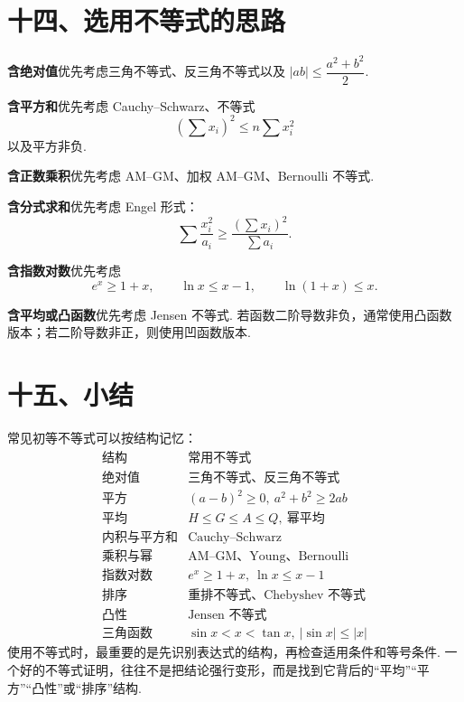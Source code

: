 \documentclass[UTF8, 12pt, fontset=fandol, oneside]{ctexart}
\begin{document}
\section*{十四、选用不等式的思路}

\noindent\textbf{含绝对值}\quad 优先考虑三角不等式、反三角不等式以及 $|ab|\le\dfrac{a^2+b^2}{2}$.

\noindent\textbf{含平方和}\quad 优先考虑 Cauchy--Schwarz、不等式
\[
  \left(\sum x_i\right)^2\le n\sum x_i^2
\]
以及平方非负.

\noindent\textbf{含正数乘积}\quad 优先考虑 AM--GM、加权 AM--GM、Bernoulli 不等式.

\noindent\textbf{含分式求和}\quad 优先考虑 Engel 形式：
\[
  \sum \frac{x_i^2}{a_i}\ge\frac{(\sum x_i)^2}{\sum a_i}.
\]

\noindent\textbf{含指数对数}\quad 优先考虑
\[
  e^x\ge1+x,\qquad \ln x\le x-1,\qquad \ln(1+x)\le x.
\]

\noindent\textbf{含平均或凸函数}\quad 优先考虑 Jensen 不等式. 若函数二阶导数非负，通常使用凸函数版本；若二阶导数非正，则使用凹函数版本.

\section*{十五、小结}

常见初等不等式可以按结构记忆：
\[
\begin{array}{c|c}
  \text{结构} & \text{常用不等式}\\ \hline
  \text{绝对值} & \text{三角不等式、反三角不等式}\\
  \text{平方} & (a-b)^2\ge0,\ a^2+b^2\ge2ab\\
  \text{平均} & H\le G\le A\le Q,\ \text{幂平均}\\
  \text{内积与平方和} & \text{Cauchy--Schwarz}\\
  \text{乘积与幂} & \text{AM--GM、Young、Bernoulli}\\
  \text{指数对数} & e^x\ge1+x,\ \ln x\le x-1\\
  \text{排序} & \text{重排不等式、Chebyshev 不等式}\\
  \text{凸性} & \text{Jensen 不等式}\\
  \text{三角函数} & \sin x<x<\tan x,\ |\sin x|\le|x|
\end{array}
\]
使用不等式时，最重要的是先识别表达式的结构，再检查适用条件和等号条件. 一个好的不等式证明，往往不是把结论强行变形，而是找到它背后的“平均”“平方”“凸性”或“排序”结构.
\end{document}

